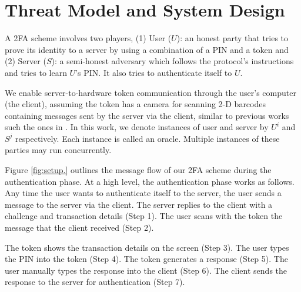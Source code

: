 


\section{Threat Model and System Design}\label{sec::model}

A 2FA scheme involves two players, (1) {User ($U$)}: an honest party that tries to prove its identity to a server by using a combination of a PIN and a token and (2) {Server ($S$)}:  a semi-honest adversary which follows the protocol's instructions and tries to learn $U$'s PIN. It also tries to authenticate itself to $U$.  

We enable server-to-hardware token communication through the user's computer (the client), assuming the token has a camera for scanning 2-D barcodes containing messages sent by the server via the client, similar to previous works such the ones in \cite{JareckiJKSS21,Digipass-website,Gemalto}. 
%
%
In this work, we denote instances of user and server by  $U^{i}$ and  $S^{j}$ respectively. Each instance is called an oracle.  Multiple instances of these parties may run concurrently. %

Figure \ref{fig:setup.} outlines the message flow of our 2FA scheme during the authentication phase.  At a high level, the authentication phase works as follows. Any time the user wants to authenticate itself to the server, the user sends a message to the server via the client.  The server replies to the client with a challenge and transaction details (Step 1). The user scans with the token the message that the client received  (Step 2). 

The token shows the transaction details on the screen (Step 3). The user types the PIN into the token (Step 4). The token generates a response (Step 5). The user manually types the response into the client (Step 6).  The client sends the response to the server for authentication (Step 7). 




